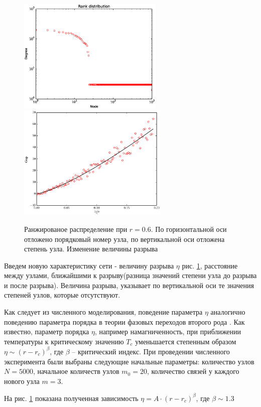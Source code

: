 \documentclass[10pt,aps,pra]{revtex4-1}
\begin{document}
\begin{figure}[H]
\label{fig:rankDistribution}
\centering
\includegraphics[height=5.5cm]{pygraph/baRank.eps}
\includegraphics[height=5.5cm]{pygraph/baGap.eps}
\caption{Ранжированое распределение при $r=0.6$. По горизонтальной оси отложено порядковый номер узла, по вертикальной оси отложена степень узла. Изменение величины разрыва}
\end{figure}

Введем новую характеристику сети - величину разрыва $\eta$ рис. \ref{fig:rankDistribution}, расстояние между узлами, ближайшими к разрыву(разница значений степени узла до разрыва и после разрыва). Величина разрыва, указывает по вертикальной оси те значения степеней узлов, которые отсутствуют. 

Как следует из численного моделирования, поведение параметра $\eta$ аналогично поведению параметра порядка в теории фазовых переходов второго рода \cite{Landau}. Как известно, параметр порядка $\eta$, например намагниченность, при приближении температуры к критическому значению $T_c$ уменьшается степенным образом $\eta \sim (r-r_c)^\beta$, где $\beta$ – критический индекс. 
При проведении численного эксперимента были выбраны следующие начальные параметры: количество узлов $N=5000$, начальное количеств узлов $m_0=20$, количество связей у каждого нового узла $m=3$.

На рис. \ref{fig:rankDistribution} показана полученная зависимость $\eta = A \cdot {(r-r_c)}^\beta$, где $\beta \sim 1.3$
\end{document}

